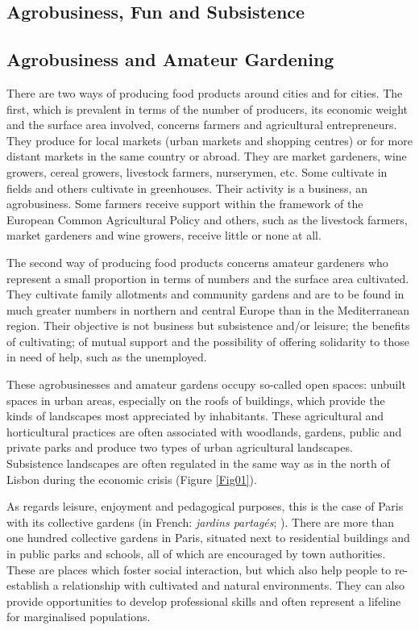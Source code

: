 \documentclass[10pt,a4paper]{article}
\begin{document}
\begin{multicols}{2}

\section{Agrobusiness, Fun and Subsistence}
\subsection{Agrobusiness and Amateur Gardening}
\noindent There are two ways of producing food products around cities and for cities. The first, which is prevalent in terms of the number of producers, its economic weight and the surface area involved, concerns farmers and agricultural entrepreneurs. They produce for local markets (urban markets and shopping centres) or for more distant markets in the same country or abroad. They are market gardeners, wine growers, cereal growers, livestock farmers, nurserymen, etc. Some cultivate in fields and others cultivate in greenhouses. Their activity is a business, an agrobusiness. Some farmers receive support within the framework of the European Common Agricultural Policy and others, such as the livestock farmers, market gardeners and wine growers, receive little or none at all.

The second way of producing food products concerns amateur gardeners who represent a small proportion in terms of numbers and the surface area cultivated. They cultivate family allotments and community gardens and are to be found in much greater numbers in northern and central Europe than in the Mediterranean region. Their objective is not business but subsistence and/or leisure; the benefits of cultivating; of mutual support and the possibility of offering solidarity to those in need of help, such as the unemployed.

These agrobusinesses and amateur gardens occupy so-called open spaces: unbuilt spaces in urban areas, especially on the roofs of buildings, which provide the kinds of landscapes most appreciated by inhabitants. These agricultural and horticultural practices are often associated with woodlands, gardens, public and private parks and produce two types of urban agricultural landscapes. Subsistence landscapes are often regulated in the same way as in the north of Lisbon during the economic crisis (Figure \ref{Fig01}).

As regards leisure, enjoyment and pedagogical purposes, this is the case of Paris with its collective gardens (in French: \textit{jardins partagés}; \citep{n02}). There are more than one hundred collective gardens in Paris, situated next to residential buildings and in public parks and schools,  all of which are encouraged by town authorities. These are places which foster social interaction, but which also help people to re-establish a relationship with cultivated and natural environments. They can also provide opportunities to develop professional skills and often represent a lifeline for marginalised populations.


\end{multicols}
\end{document}
